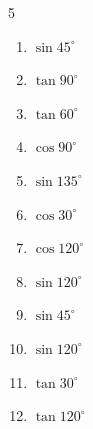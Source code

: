 \begin{multicols}{5}
\begin{enumerate}

  \item $\displaystyle \sin{45^\circ}$


  \item $\displaystyle \tan{90^\circ}$

        \phantom{$\displaystyle なし$}

  \item $\displaystyle \tan{60^\circ}$


  \item $\displaystyle \cos{90^\circ}$

        \phantom{$\displaystyle =0$}

  \item $\displaystyle \sin{135^\circ}$


  \item $\displaystyle \cos{30^\circ}$


  \item $\displaystyle \cos{120^\circ}$


  \item $\displaystyle \sin{120^\circ}$


  \item $\displaystyle \sin{45^\circ}$


  \item $\displaystyle \sin{120^\circ}$


\columnbreak %

\resetques

  \item $\displaystyle \tan{30^\circ}$


  \item $\displaystyle \tan{120^\circ}$


\end{enumerate}
\end{multicols}
